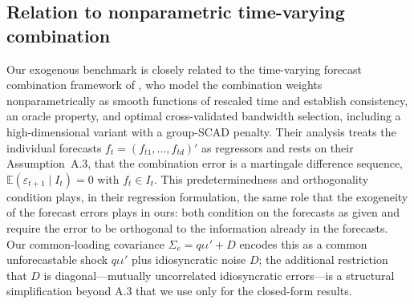 
\subsection{Relation to nonparametric time-varying combination}
\label{subsec:chenmaung}

Our exogenous benchmark is closely related to the time-varying forecast combination
framework of \citet{ChenMaung2023}, who model the combination weights nonparametrically as
smooth functions of rescaled time and establish consistency, an oracle property, and
optimal cross-validated bandwidth selection, including a high-dimensional variant with a
group-SCAD penalty. Their analysis treats the individual forecasts
$f_t=(f_{t1},\dots,f_{td})'$ as regressors and rests on their Assumption~A.3, that the
combination error is a martingale difference sequence,
$\mathbb{E}(\varepsilon_{t+1}\mid I_t)=0$ with $f_t\in I_t$. This predeterminedness and
orthogonality condition plays, in their regression formulation, the same role that the
exogeneity of the forecast errors plays in ours: both condition on the forecasts as given
and require the error to be orthogonal to the information already in the forecasts. Our
common-loading covariance $\Sigma_e=q\iota\iota'+D$ encodes this as a common unforecastable
shock $q\iota\iota'$ plus idiosyncratic noise $D$; the additional restriction that $D$ is
diagonal---mutually uncorrelated idiosyncratic errors---is a structural simplification
beyond A.3 that we use only for the closed-form results.

